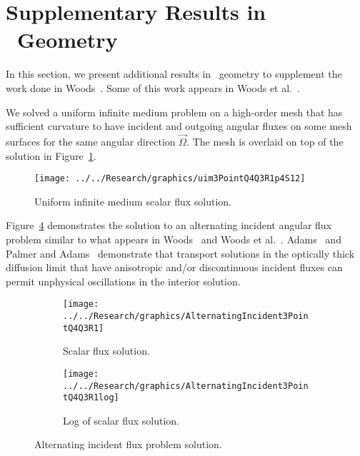 \documentclass{article}
\begin{document}
\section{Supplementary Results in \XY\ Geometry}
In this section, we present additional results in \XY\ geometry to supplement the work done in Woods~\cite{WoodsThesis}. Some of this work appears in Woods et al.~\cite{Woods2018HOSnXY}.

We solved a uniform infinite medium problem on a high-order mesh that has sufficient curvature to have incident and outgoing angular fluxes on some mesh surfaces for the same angular direction $\vec{\Omega}$. The mesh is overlaid on top of the solution in Figure~\ref{fig:uim3PointQ4Q3R1p4S12}.

\begin{figure}[!htb]
\centering
\texttt{[image: ../../Research/graphics/uim3PointQ4Q3R1p4S12]}
\caption{Uniform infinite medium scalar flux solution.}
\label{fig:uim3PointQ4Q3R1p4S12}
\end{figure}

Figure~\ref{fig:AlternatingIncident3PointQ4Q3R1} demonstrates the solution to an alternating incident angular flux problem similar to what appears in Woods~\cite{WoodsThesis} and Woods et al.~\cite{WoodsHoDgfemXyCurved}. Adams~\cite{AdamsDFEMDiffLimit} and Palmer and Adams~\cite{PalmerCurvilinearTransport} demonstrate that transport solutions in the optically thick diffusion limit that have anisotropic and/or discontinuous incident fluxes can permit unphysical oscillations in the interior solution.

\begin{figure}[!htb]
\centering
\begin{subfigure}{\textwidth}
\centering
\texttt{[image: ../../Research/graphics/AlternatingIncident3PointQ4Q3R1]}
\caption{Scalar flux solution.}
\label{subfig:AlternatingIncident3PointQ4Q3R1}
\end{subfigure}
\begin{subfigure}{\textwidth}
\centering
\texttt{[image: ../../Research/graphics/AlternatingIncident3PointQ4Q3R1log]}
\caption{Log of scalar flux solution.}
\label{subfig:AlternatingIncident3PointQ4Q3R1log}
\end{subfigure}
\caption{Alternating incident flux problem solution.}
\label{fig:AlternatingIncident3PointQ4Q3R1}
\end{figure}





\FloatBarrier
\end{document}
